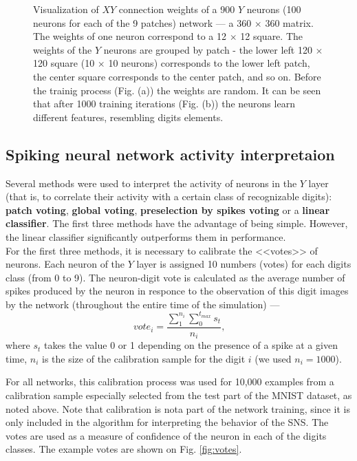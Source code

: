 \documentclass[a4paper]{article}
\begin{document}
\begin{figure}
\begin{subfigure}{0.45\textwidth}
    \caption{} 
\end{subfigure}
\caption{Visualization of $XY$ connection weights of a 900 $Y$ neurons (100 neurons for each of the 9 patches) network --- a 360 $ \times $ 360 matrix. The weights of one neuron correspond to a 12 $\times$ 12 square. The weights of the $Y$ neurons are grouped by patch - the lower left 120 $  \times $ 120 square  (10 $ \times $ 10 neurons) corresponds to the lower left patch, the center square corresponds to the center patch, and so on. Before the trainig process (Fig. (a)) the weights are random. It can be seen that after 1000 training iterations (Fig. (b)) the neurons learn different features, resembling digits elements.}
\label{fig:training}
\end{figure}

\subsection{Spiking neural network activity interpretaion}

Several methods were used to interpret the activity of neurons in the $Y$ layer (that is, to correlate their activity with a certain class of recognizable digits): \textbf{patch voting}, \textbf{global voting}, \textbf{preselection by spikes voting} or a \textbf{linear classifier}. The first three methods have the advantage of being simple. However, the linear classifier significantly outperforms them in performance. \\

For the first three methods, it is necessary to calibrate the <<votes>> of neurons. Each neuron of the $Y$ layer is assigned 10 numbers (votes) for each digits class (from 0 to 9). The neuron-digit vote is calculated as the average number of spikes produced by the neuron in responce to the observation of this digit images by the network (throughout the entire time of the simulation) ---
$$ vote_i = \frac{\sum_ {1}^{n_{i}}{\sum_{0}^{t_{max}} s_t}} {n_{i}} \text {,} $$
where $ s_t $ takes the value 0 or 1 depending on the presence of a spike at a given time, $ n_i $ is the size of the calibration sample for the digit $ i $ (we used $ n_i = 1000 $).

For all networks, this calibration process was used for 10,000 examples from a calibration sample especially selected from the test part of the MNIST dataset, as noted above. Note that calibration is nota  part of the network training, since it is only included in the algorithm for interpreting the behavior of the SNS. The votes are used as a measure of confidence of the neuron in each of the digits classes. The example votes are shown on Fig. \ref{fig:votes}.
\end{document}
